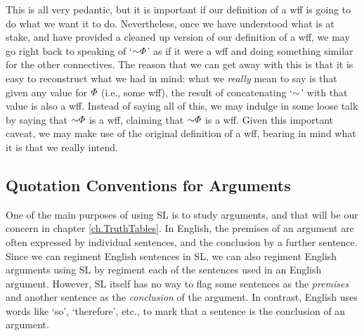 This is all very pedantic, but it is important if our definition of a wff is going to do what we want it to do.
Nevertheless, once we have understood what is at stake, and have provided a cleaned up version of our definition of a wff, we may go right back to speaking of `$\enot \metaA{}$' as if it were a wff and doing something similar for the other connectives. 
The reason that we can get away with this is that it is easy to reconstruct what we had in mind: what we \textit{really} mean to say is that given any value for $\varPhi{}$ (i.e., some wff), the result of concatenating `$\enot$' with that value is also a wff.
Instead of saying all of this, we may indulge in some loose talk by saying that $\enot \metaA{}$ is a wff, claiming that $\enot \metaA{}$ is a wff. 
Given this important caveat, we may make use of the original definition of a wff, bearing in mind what it is that we really intend.





\subsection{Quotation Conventions for Arguments}
  \label{sub:QuoteArguments}

One of the main purposes of using SL is to study arguments, and that will be our concern in chapter \ref{ch.TruthTables}.
In English, the premises of an argument are often expressed by individual sentences, and the conclusion by a further sentence.
Since we can regiment English sentences in SL, we can also regiment English arguments using SL by regiment each of the sentences used in an English argument.
However, SL itself has no way to flag some sentences as the \emph{premises} and another sentence as the \emph{conclusion} of the argument.
In contrast, English uses words like `so', `therefore', etc., to mark that a sentence is the conclusion of an argument.


